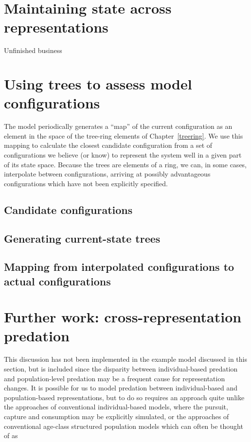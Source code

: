 \section{Maintaining state across representations}

Unfinished business

\section{Using trees to assess model configurations}

The model periodically generates a ``map'' of the current
configuration as an element in the space of the tree-ring elements of
Chapter~\ref{treering}.  We use this mapping to calculate the
closest candidate configuration from a set of configurations we
believe (or know) to represent the system well in a given part of its
state space. Because the trees are elements of a ring, we can, in some cases,
interpolate between configurations, arriving at possibly advantageous
configurations which have not been explicitly specified.

\subsection{Candidate configurations}


\subsection{Generating current-state trees}


\subsection{Mapping from interpolated configurations to actual
  configurations}





\section{Further work: cross-representation predation}

This discussion has not been implemented in the example model
discussed in this section, but is included since the disparity between
individual-based predation and population-level predation may be a
frequent cause for representation changes.  It is possible for us to
model predation between individual-based and population-based
representations, but to do so requires an approach quite unlike the
approaches of conventional individual-based models, where the pursuit,
capture and consumption may be explicitly simulated, or the approaches
of conventional age-class structured population models which can often
be thought of as


